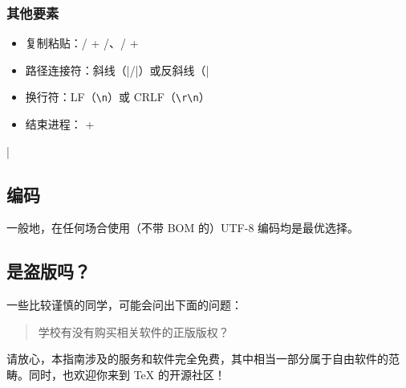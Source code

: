 \subsubsection{其他要素}

\begin{itemize}
  \item 复制粘贴：/ + /、/ + 
  \item 路径连接符：斜线（|/|）或反斜线（|\|）
  \item 换行符：LF（\lstinline{\n}）或 CRLF（\lstinline{\r\n}）
  \item 结束进程： + 
\end{itemize}

\lstDeleteShortInline|

\subsection{编码}

一般地，在任何场合使用（不带 BOM 的）UTF-8 编码均是最优选择。

\subsection{是盗版吗？}

一些比较谨慎的同学，可能会问出下面的问题：
\begin{quote}
  \kaishu 学校有没有购买相关软件的正版版权？
\end{quote}

请放心，本指南涉及的服务和软件完全免费，其中相当一部分属于自由软件的范畴。同时，也欢迎你来到 \TeX{} 的开源社区！

